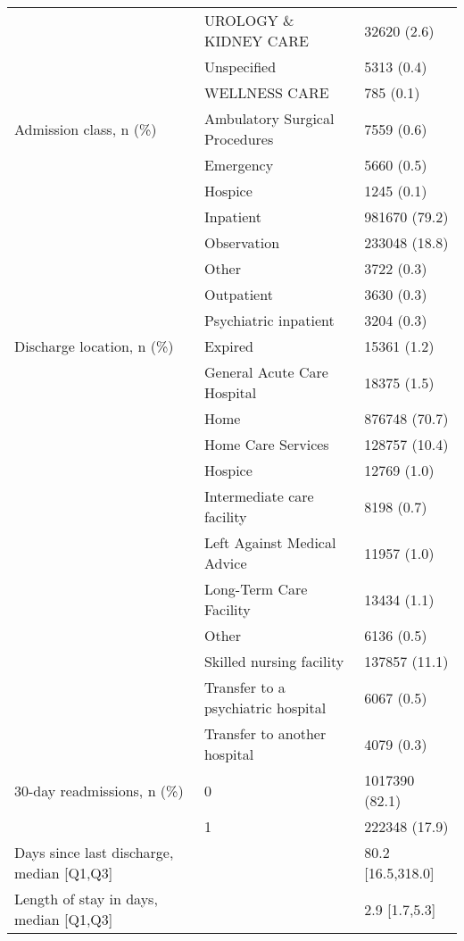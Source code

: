 \begin{tabular}{lll}
                                       & UROLOGY \& KIDNEY CARE &        32620 (2.6) \\
                                       & Unspecified &         5313 (0.4) \\
                                       & WELLNESS CARE &          785 (0.1) \\
Admission class, n (\%) & Ambulatory Surgical Procedures &         7559 (0.6) \\
                                       & Emergency &         5660 (0.5) \\
                                       & Hospice &         1245 (0.1) \\
                                       & Inpatient &      981670 (79.2) \\
                                       & Observation &      233048 (18.8) \\
                                       & Other &         3722 (0.3) \\
                                       & Outpatient &         3630 (0.3) \\
                                       & Psychiatric inpatient &         3204 (0.3) \\
Discharge location, n (\%) & Expired &        15361 (1.2) \\
                                       & General Acute Care Hospital &        18375 (1.5) \\
                                       & Home &      876748 (70.7) \\
                                       & Home Care Services &      128757 (10.4) \\
                                       & Hospice &        12769 (1.0) \\
                                       & Intermediate care facility &         8198 (0.7) \\
                                       & Left Against Medical Advice &        11957 (1.0) \\
                                       & Long-Term Care Facility &        13434 (1.1) \\
                                       & Other &         6136 (0.5) \\
                                       & Skilled nursing facility &      137857 (11.1) \\
                                       & Transfer to a psychiatric hospital &         6067 (0.5) \\
                                       & Transfer to another hospital &         4079 (0.3) \\
30-day readmissions, n (\%) & 0 &     1017390 (82.1) \\
                                       & 1 &      222348 (17.9) \\
Days since last discharge, median [Q1,Q3] &   &  80.2 [16.5,318.0] \\
Length of stay in days, median [Q1,Q3] &   &      2.9 [1.7,5.3] \\
\bottomrule
\end{tabular}
